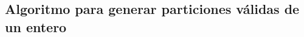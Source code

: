 
  \subsection{Algoritmo para generar particiones válidas de un
  entero}\label{secc:algo_particiones_validas}

